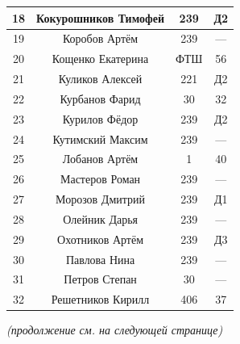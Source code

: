 \documentclass[12pt]{article}
\newlength{\h}
\newlength{\x}
\begin{document}
\begin{table}[ht]
\begin{minipage}[t]{0.48\linewidth}
\begin{tabular}[h]{|c|c|c|c|}
      18 & Кокурошников Тимофей & 239 & Д2  \\ \hline
      19 & Коробов Артём & 239 & ---  \\ \hline
      20 & Кощенко Екатерина & ФТШ & 56  \\ \hline
      21 & Куликов Алексей & 221 & Д2  \\ \hline
      22 & Курбанов Фарид & 30 & 32  \\ \hline
      23 & Курилов Фёдор & 239 & Д2  \\ \hline
      24 & Кутимский Максим & 239 & ---  \\ \hline
      25 & Лобанов Артём & 1 & 40  \\ \hline
      26 & Мастеров Роман & 239 & ---  \\ \hline
      27 & Морозов Дмитрий & 239 & Д1  \\ \hline
      28 & Олейник Дарья & 239 & ---  \\ \hline
      29 & Охотников Артём & 239 & Д3  \\ \hline
      30 & Павлова Нина & 239 & ---  \\ \hline
      31 & Петров Степан & 30 & ---  \\ \hline
      32 & Решетников Кирилл & 406 & 37  \\ \hline
    \end{tabular}
  \end{minipage}
\end{table}

\begin{center}
\textit{(продолжение см. на следующей странице)}  
\end{center}


\clearpage
\end{document}

